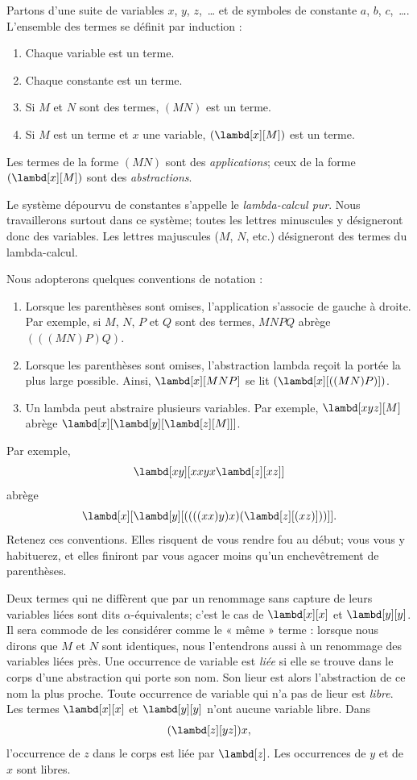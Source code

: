 \documentclass[../../../include/open-logic-section]{subfiles}
\begin{document}

Partons d'une suite de variables $x$, $y$,
$z$,~\dots{} et de symboles de constante $a$,
$b$, $c$,~\dots. L'ensemble des termes se
définit par induction :
\begin{enumerate}
\item Chaque variable est un terme.
\item Chaque constante est un terme.
\item Si $M$ et $N$ sont des termes, $(MN)$
      est un terme.
\item Si $M$ est un terme et $x$ une variable,
      $(\lambd[x][M])$ est un terme.
\end{enumerate}
Les termes de la forme $(MN)$ sont des
\emph{applications}; ceux de la forme
$(\lambd[x][M])$ sont des \emph{abstractions}.

Le système dépourvu de constantes s'appelle
le \emph{lambda-calcul pur}. Nous travaillerons
surtout dans ce système; toutes les lettres
minuscules y désigneront donc des variables.
Les lettres majuscules ($M$, $N$, etc.)
désigneront des termes du lambda-calcul.

Nous adopterons quelques conventions de
notation :

\begin{conv}
\begin{enumerate}
\item Lorsque les parenthèses sont omises,
      l'application s'associe de gauche à droite.
      Par exemple, si $M$, $N$, $P$ et $Q$ sont
      des termes, $MNPQ$ abrège $(((MN)P)Q)$.
\item Lorsque les parenthèses sont omises,
      l'abstraction lambda reçoit la portée la
      plus large possible. Ainsi,
      $\lambd[x][MNP]$ se lit
      $(\lambd[x][((MN)P)])$.
\item Un lambda peut abstraire plusieurs
      variables. Par exemple,
      $\lambd[xyz][M]$ abrège
      $\lambd[x][\lambd[y][\lambd[z][M]]]$.
\end{enumerate}
\end{conv}

Par exemple,
\[
\lambd[xy][xxyx \lambd[z][xz]]
\]
abrège
\[
\lambd[x][\lambd[y][((((xx)y)x)(\lambd[z][(xz)]))]].
\]
Retenez ces conventions. Elles risquent de
vous rendre fou au début; vous vous y
habituerez, et elles finiront par vous
agacer moins qu'un enchevêtrement de
parenthèses.

Deux termes qui ne diffèrent que par un renommage sans capture
de leurs variables liées sont dits
$\alpha$-équivalents; c'est le cas de
$\lambd[x][x]$ et $\lambd[y][y]$. Il sera
commode de les considérer comme le « même »
terme : lorsque nous dirons que $M$ et $N$
sont identiques, nous l'entendrons aussi à
un renommage des variables liées près.
Une occurrence de variable est \emph{liée} si elle se trouve
dans le corps d'une abstraction qui porte son nom.
Son lieur est alors l'abstraction de ce nom la plus proche.
Toute occurrence de variable qui n'a pas de lieur est \emph{libre}.
Les termes $\lambd[x][x]$ et $\lambd[y][y]$ n'ont aucune
variable libre. Dans
\[
(\lambd[z][yz])x,
\]
l'occurrence de $z$ dans le corps est liée par $\lambd[z]$.
Les occurrences de $y$ et de $x$ sont libres.
\end{document}
